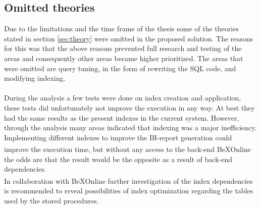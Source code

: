\documentclass{cslthse-msc}
\newcommand{\bex}{BeX\textsuperscript{\textregistered}}
\begin{document}
\subsection{Omitted theories}
Due to the limitations and the time frame of the thesis some of the theories stated in section \ref{sec:theory} were omitted in the proposed solution. The reasons for this was that the above reasons prevented full research and testing of the areas and consequently other areas became higher prioritized. The areas that were omitted are query tuning, in the form of rewriting the SQL code, and modifying indexing.\\\\During the analysis a few tests were done on index creation and application, these tests did unfortunately not improve the execution in any way. At best they     had the same results as the present indexes in the current system. However, through the analysis many areas indicated that indexing was a major inefficiency. Implementing different indexes to improve the BI-report generation could improve the execution time, but without any access to the back-end \bex Online the odds are that the result would be the opposite as a result of back-end dependencies.\\ In collaboration with \bex Online further investigation of the index dependencies is recommended to reveal possibilities of index optimization regarding the tables used by the stored procedures.\\\\
\end{document}
